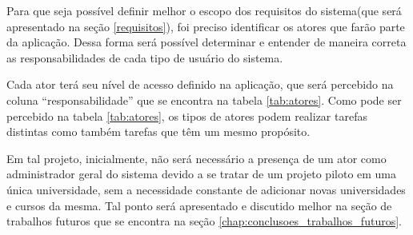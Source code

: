 Para que seja possível definir melhor o escopo dos requisitos do sistema(que será apresentado na seção \ref{requisitos}), foi preciso identificar os atores que farão parte da aplicação. Dessa forma será possível determinar e entender de maneira correta as responsabilidades de cada tipo de usuário do sistema. \par
Cada ator terá seu nível de acesso definido na aplicação, que será percebido na coluna “responsabilidade” que se encontra na tabela \ref{tab:atores}. Como pode ser percebido na tabela \ref{tab:atores}, os tipos de atores podem realizar tarefas distintas como também tarefas que têm um mesmo propósito. \par
Em tal projeto, inicialmente, não será necessário a presença de um ator como administrador geral do sistema devido a se tratar de um projeto piloto em uma única universidade, sem a necessidade constante de adicionar novas universidades e cursos da mesma. Tal ponto será apresentado e discutido melhor na seção de trabalhos futuros que se encontra na seção \ref{chap:conclusoes_trabalhos_futuros}.

\begin{table}[ht]
\centering
\caption{Tabela de atores do sistema}
\label{tab:atores}
\end{table}

